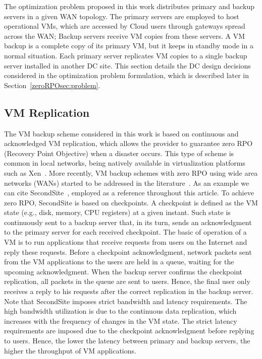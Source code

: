 \documentclass[preprint]{elsarticle}
\begin{document}
The optimization problem proposed in this work distributes primary and backup servers in a given WAN topology. 
The primary servers are employed to host operational VMs, which are accessed by Cloud users through gateways spread across the WAN;
Backup servers receive VM copies from these servers. A VM backup is a complete copy of its primary VM, but it keeps in standby mode in a normal situation. 
Each primary server replicates VM copies to a single backup server installed in another DC site. This section details the DC design decisions considered in the optimization problem formulation, which is described later in Section~\ref{zeroRPOsec:problem}.

\subsection{VM Replication}

The VM backup scheme considered in this work is based on continuous and acknowledged VM replication, which allows the provider to guarantee zero RPO (Recovery Point Objective) when a disaster occurs. This type of scheme is common in local networks, being natively available in virtualization platforms such as Xen~\cite{cully2008remus}. 
More recently, VM backup schemes with zero RPO using wide area networks (WANs) started to be addressed in the literature~\cite{rajagopalan2012secondsite,wood2011Pipecloud}.
As an example we can cite SecondSite~\cite{rajagopalan2012secondsite}, employed as a reference throughout this article.
To achieve zero RPO, SecondSite is based on checkpoints. A checkpoint is defined as the VM state (e.g., disk, memory, CPU registers) at a given instant. Such state is continuously sent to a backup server that, in its turn, sends an acknowledgment to the primary server for each received checkpoint. 
The basic of operation of a VM is to run applications that receive requests from users on the Internet and reply these requests.
Before a checkpoint acknowledgment, network packets sent from the VM applications to the users are held in a queue, waiting for the upcoming acknowledgment. When the backup server confirms the checkpoint replication, all packets in the queue are sent to users.
Hence, the final user only receives a reply to his requests after the correct replication in the backup server.
Note that SecondSite imposes strict bandwidth and latency requirements. The high bandwidth utilization is due to the continuous data replication, which increases 
with the frequency of changes in the VM state.
The strict latency requirements are imposed due to the checkpoint acknowledgment before replying to users.
Hence, the lower the latency between primary and backup servers, the higher the throughput of VM applications.
\end{document}
